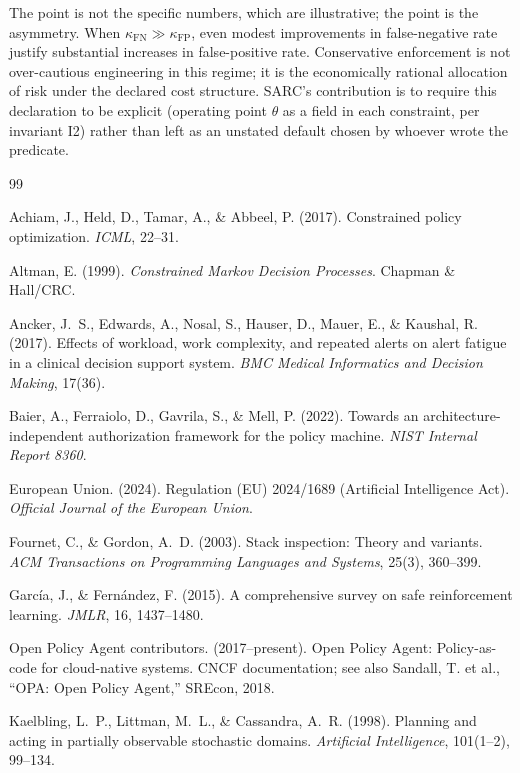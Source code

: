 \documentclass[11pt,a4paper]{article}
\theoremstyle{remark}
\begin{document}
The point is not the specific numbers, which are illustrative; the point is the asymmetry. When $\kappa_{\text{FN}} \gg \kappa_{\text{FP}}$, even modest improvements in false-negative rate justify substantial increases in false-positive rate. Conservative enforcement is not over-cautious engineering in this regime; it is the economically rational allocation of risk under the declared cost structure. SARC's contribution is to require this declaration to be explicit (operating point $\theta$ as a field in each constraint, per invariant I2) rather than left as an unstated default chosen by whoever wrote the predicate.

\small
\begin{thebibliography}{99}

Achiam, J., Held, D., Tamar, A., \& Abbeel, P. (2017). Constrained policy optimization. \textit{ICML}, 22--31.

Altman, E. (1999). \textit{Constrained Markov Decision Processes}. Chapman \& Hall/CRC.

Ancker, J.~S., Edwards, A., Nosal, S., Hauser, D., Mauer, E., \& Kaushal, R. (2017). Effects of workload, work complexity, and repeated alerts on alert fatigue in a clinical decision support system. \textit{BMC Medical Informatics and Decision Making}, 17(36).

Baier, A., Ferraiolo, D., Gavrila, S., \& Mell, P. (2022). Towards an architecture-independent authorization framework for the policy machine. \textit{NIST Internal Report 8360}.

European Union. (2024). Regulation (EU) 2024/1689 (Artificial Intelligence Act). \textit{Official Journal of the European Union}.

Fournet, C., \& Gordon, A.~D. (2003). Stack inspection: Theory and variants. \textit{ACM Transactions on Programming Languages and Systems}, 25(3), 360--399.

García, J., \& Fernández, F. (2015). A comprehensive survey on safe reinforcement learning. \textit{JMLR}, 16, 1437--1480.

Open Policy Agent contributors. (2017--present). Open Policy Agent: Policy-as-code for cloud-native systems. CNCF documentation; see also Sandall, T. et al., ``OPA: Open Policy Agent,'' SREcon, 2018.

Kaelbling, L.~P., Littman, M.~L., \& Cassandra, A.~R. (1998). Planning and acting in partially observable stochastic domains. \textit{Artificial Intelligence}, 101(1--2), 99--134.


\end{thebibliography}
\end{document}
